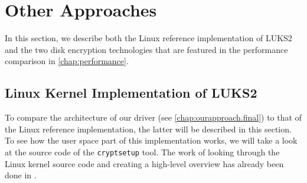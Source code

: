 \chapter{Other Approaches}
\label{chap:otherapproaches}
In this section, we describe both the Linux reference implementation of LUKS2 and the two disk encryption technologies that are featured in the performance comparison in \autoref{chap:performance}.

\section{Linux Kernel Implementation of LUKS2}
\label{chap:otherapproaches.linux}
To compare the architecture of our driver (see \autoref{chap:ourapproach.final}) to that of the Linux reference implementation, the latter will be described in this section. To see how the user space part of this implementation works, we will take a look at the source code of the \texttt{cryptsetup} tool. The work of looking through the Linux kernel source code and creating a high-level overview has already been done in \cite{Korchagin2020}.

